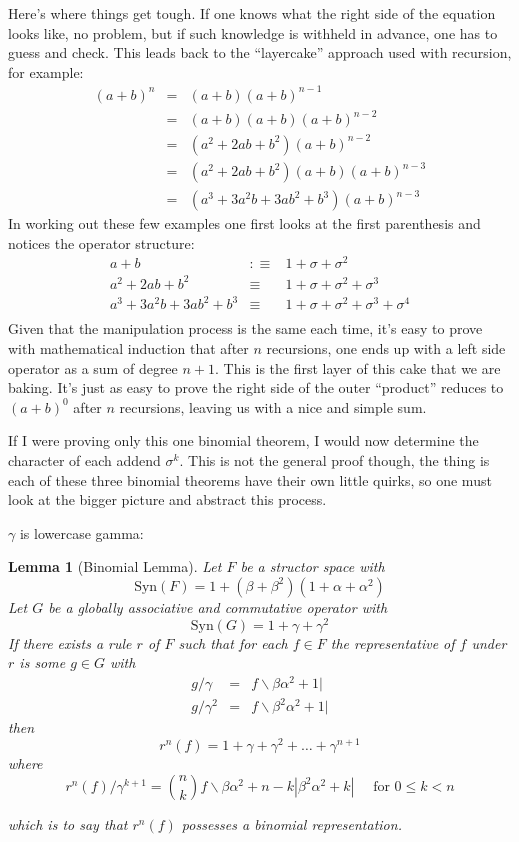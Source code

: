 \documentclass[twoside]{article}
\newtheorem{lemma}[theorem]{Lemma}
\begin{document}
Here's where things get tough.  If one knows what the right side of the equation looks
like, no problem, but if such knowledge is withheld in advance, one has to guess and
check.  This leads back to the ``layercake'' approach used with recursion, for example:
\begin{eqnarray*}
(a+b)^n & = & (a+b)(a+b)^{n-1} \\
 & = & (a+b)(a+b)(a+b)^{n-2} \\
 & = & (a^2+2ab+b^2)(a+b)^{n-2} \\
 & = & (a^2+2ab+b^2)(a+b)(a+b)^{n-3} \\
 & = & (a^3+3a^2b+3ab^2+b^3)(a+b)^{n-3}
\end{eqnarray*}
In working out these few examples one first looks at the first parenthesis and notices the operator structure:
\begin{eqnarray*}
a+b & :\equiv & 1+\sigma+\sigma^2 \\
a^2+2ab+b^2 & \equiv & 1+\sigma+\sigma^2+\sigma^3 \\
a^3+3a^2b+3ab^2+b^3 & \equiv & 1+\sigma+\sigma^2+\sigma^3+\sigma^4 \\
\end{eqnarray*}
Given that the manipulation process is the same each time, it's easy to prove with mathematical induction that
after $ n $ recursions, one ends up with a left side operator as a sum of degree $ n+1 $.  This is the first
layer of this cake that we are baking.  It's just as easy to prove the right side of the outer ``product''
reduces to $ (a+b)^0 $ after $ n $ recursions, leaving us with a nice and simple sum.

If I were proving only this one binomial theorem, I would now determine the character of each addend $ \sigma^k $.
This is not the general proof though, the thing is each of these three binomial theorems have their own little
quirks, so one must look at the bigger picture and abstract this process.

$ \gamma $ is lowercase gamma:

\begin{lemma}[Binomial Lemma]

Let $ F $ be a structor space with
$$ \mbox{Syn}(F)=1+(\beta+\beta^2)(1+\alpha+\alpha^2) $$
Let $ G $ be a globally associative and commutative operator with
$$ \mbox{Syn}(G)=1+\gamma+\gamma^2 $$
If there exists a rule $ r $ of $ F $ such that for each $ f\in F $
the representative of $ f $ under $ r $ is some $ g\in G $ with
\begin{eqnarray*}
g/\gamma & = & f\backslash\beta\alpha^2+1| \\
g/\gamma^2 & = & f\backslash\beta^2\alpha^2+1|
\end{eqnarray*}
then
$$ r^n(f)=1+\gamma+\gamma^2+\ldots+\gamma^{n+1} $$
where
$$ r^n(f)/\gamma^{k+1}={n\choose k}f\backslash\beta\alpha^2+n-k|\beta^2\alpha^2+k|\quad\mbox{ for } 0 \le k < n $$

which is to say that $ r^n(f) $ possesses a binomial representation.

\end{lemma}
\end{document}
